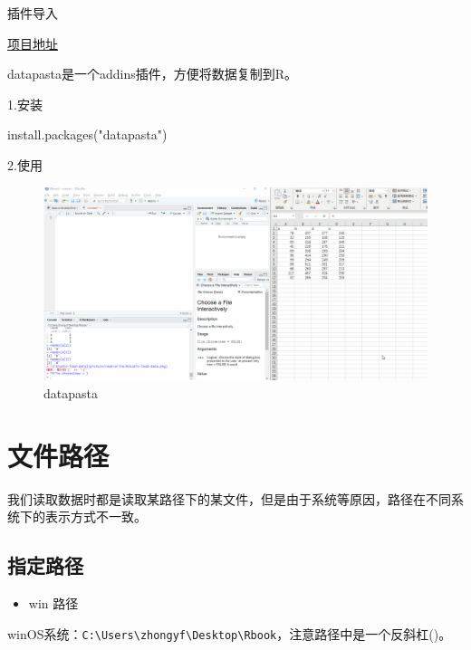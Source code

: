 \documentclass[
]{book}
\newenvironment{Shaded}{\begin{snugshade}}{\end{snugshade}}
\newcommand{\FunctionTok}[1]{\textcolor[rgb]{0.00,0.00,0.00}{#1}}
\newcommand{\NormalTok}[1]{#1}
\newcommand{\StringTok}[1]{\textcolor[rgb]{0.31,0.60,0.02}{#1}}
\providecommand{\tightlist}{%
  \setlength{\itemsep}{0pt}\setlength{\parskip}{0pt}}
\begin{document}
插件导入

\href{https://github.com/milesmcbain/datapasta}{项目地址}

datapasta是一个addins插件，方便将数据复制到R。

1.安装

\begin{Shaded}
\begin{Highlighting}[]
\FunctionTok{install.packages}\NormalTok{(}\StringTok{"datapasta"}\NormalTok{)}
\end{Highlighting}
\end{Shaded}

2.使用

\begin{figure}
\centering
\includegraphics{picture/read-write/datapasta-copy.gif}
\caption{datapasta}
\end{figure}

\hypertarget{data:file-path}{%
\section{文件路径}\label{data:file-path}}

我们读取数据时都是读取某路径下的某文件，但是由于系统等原因，路径在不同系统下的表示方式不一致。

\hypertarget{ux6307ux5b9aux8defux5f84}{%
\subsection{指定路径}\label{ux6307ux5b9aux8defux5f84}}

\begin{itemize}
\tightlist
\item
  win 路径
\end{itemize}

winOS系统：\texttt{C:\textbackslash{}Users\textbackslash{}zhongyf\textbackslash{}Desktop\textbackslash{}Rbook}，注意路径中是一个反斜杠()。
\end{document}
